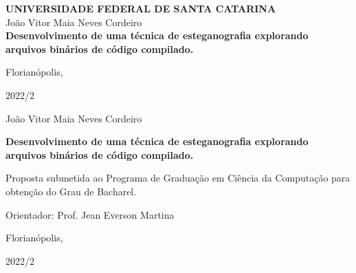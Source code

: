 \begin{center}

\Large{\textbf{UNIVERSIDADE FEDERAL DE SANTA CATARINA}}\\
[5cm]
João Vitor Maia Neves Cordeiro\\
[5cm]
\textbf{Desenvolvimento de uma técnica de esteganografia explorando arquivos binários de código compilado.}
\vspace*{\fill}

Florianópolis,

2022/2
\end{center}

\newpage
\thispagestyle{empty}
\mbox{}
\newpage

\begin{center}
João Vitor Maia Neves Cordeiro\\
\end{center}

\vspace*{\fill}

\begin{center}
    \textbf{Desenvolvimento de uma técnica de esteganografia explorando arquivos binários de código compilado.}
    \\
    [5cm]
\end{center}


\hfill\begin{minipage}{0.5\linewidth}
Proposta submetida ao Programa de
Graduação em Ciência da Computação
para obtenção do Grau de Bacharel.

Orientador: Prof. Jean Everson Martina\\
[7cm]
\end{minipage}


\begin{center}
Florianópolis,

2022/2
\end{center}